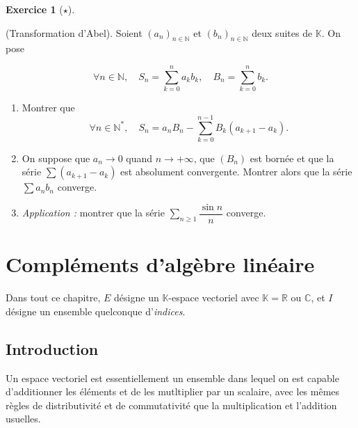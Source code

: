 \documentclass[
  french,
  letterpaper,
  DIV=11,
  numbers=noendperiod]{scrreprt}
\theoremstyle{plain}
\theoremstyle{definition}
\theoremstyle{plain}
\theoremstyle{plain}
\theoremstyle{definition}
\newtheorem{exercise}{Exercice}[chapter]
\theoremstyle{definition}
\theoremstyle{plain}
\theoremstyle{remark}
\begin{document}
\begin{exercise}[\(\star\)]\protect\hypertarget{exr-02-abel}{}\label{exr-02-abel}

(Transformation d'Abel). Soient \((a_n)_{n\in\mathbb{N}}\) et
\((b_n)_{n\in\mathbb{N}}\) deux suites de \(\mathbb{K}\). On pose

\[
\forall n\in\mathbb{N},\quad S_n = \sum_{k=0}^n a_kb_k,\quad B_n = \sum_{k=0}^n b_k.
\]

\begin{enumerate}
\def\labelenumi{\arabic{enumi}.}
\item
  Montrer que
  \[\forall n\in\mathbb{N}^*,\quad S_n = a_nB_n - \sum_{k=0}^{n-1}B_k(a_{k+1}-a_k).\]
\item
  On suppose que \(a_n\to 0\) quand \(n\to +\infty\), que \((B_n)\) est
  bornée et que la série \(\sum (a_{k+1}-a_k)\) est absolument
  convergente. Montrer alors que la série \(\sum a_nb_n\) converge.
\item
  \emph{Application :} montrer que la série
  \(\displaystyle\sum_{n\geqslant 1} \dfrac{\sin n}{n}\) converge.
\end{enumerate}

\end{exercise}


\chapter{Compléments d'algèbre
linéaire}\label{compluxe9ments-dalguxe8bre-linuxe9aire}

\newcommand{\im}{\operatorname{Im}}
\newcommand{\id}{\operatorname{Id}}

Dans tout ce chapitre, \(E\) désigne un \(\mathbb{K}\)-espace vectoriel
avec \(\mathbb{K}=\mathbb{R}\) ou \(\mathbb{C}\), et \(I\) désigne un
ensemble quelconque d'\emph{indices}.

\section*{Introduction}\label{introduction-2}


Un espace vectoriel est essentiellement un ensemble dans lequel on est
capable d'additionner les éléments et de les mutltiplier par un
scalaire, avec les mêmes règles de distributivité et de commutativité
que la multiplication et l'addition usuelles.
\end{document}
